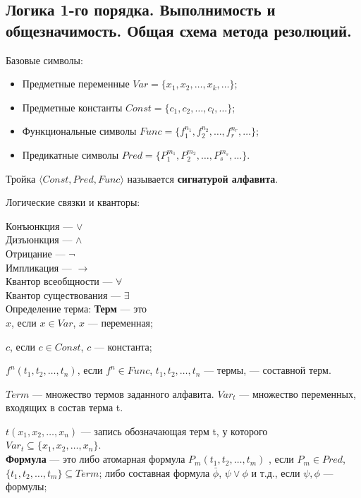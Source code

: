 \subsection{Логика 1-го порядка.  Выполнимость и общезначимость. Общая схема метода резолюций.}

Базовые символы: 
\begin{itemize}
    \item Предметные переменные $Var = \{x_1, x_2, \ldots, x_k, \ldots\}$;
    \item Предметные константы $Const = \{c_1, c_2,\ldots, c_l,\ldots\}$;
    \item Функциональные символы $Func = \{f^{n_1}_1,f^{n_2}_2,\ldots, f^{n_r}_r,\ldots\}$;
    \item Предикатные символы $Pred = \{P^{m_1}_1,P^{m_2}_2, \ldots, P^{m_s}_s,\ldots\}$.
\end{itemize}
Тройка $\langle Const,Pred,Func\rangle$ называется \textbf{сигнатурой алфавита}.

Логические связки и кванторы: 

Конъюнкция --- $\vee$ \\
Дизъюнкция --- $ \wedge $ \\
Отрицание --- $ \lnot $ \\
Импликация --- $ \longrightarrow $ \\
Квантор всеобщности --- $ \forall $ \\
Квантор существования --- $\exists$ \\


Определение терма: 
\textbf{Терм} --- это \\
$x$, если $x \in Var$, $x$ --- переменная;

$c$, если $c \in Const$, $c$ --- константа;

$f^n(t_1, t_2,\ldots, t_n)$,  если $f^n \in Func$, $t_1, t_2,\ldots, t_n$ --- термы, --- составной терм.

$Term$ --- множество термов заданного алфавита.
$Var_t$ --- множество переменных, входящих в состав терма t.

$t(x_1, x_2,\ldots, x_n)$ --- запись обозначающая терм t, у которого ${Var}_t \subseteq \{x_1, x_2,\ldots, x_n\}$.\\

\textbf{Формула} --- это либо атомарная формула
$P_m(t_1, t_2,\ldots, t_m)$ , если $ P_m \in Pred $, $\{t_1, t_2,\ldots, t_m\} \subseteq Term $; 
либо составная формула
$\bar{\phi}$, $\psi \vee \phi$ и т.д., если $\psi, \phi$ — формулы; 

